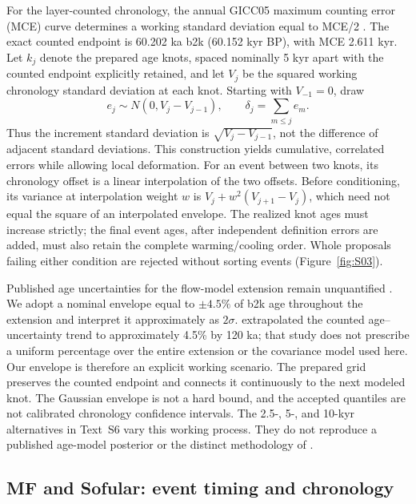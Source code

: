 \documentclass[11pt]{article}
\begin{document}
For the layer-counted chronology, the annual GICC05 maximum counting error (MCE) curve determines a working standard deviation equal to MCE/2 \citep{svensson2008sixty,rasmussen2022gicc05}. The exact counted endpoint is 60.202 ka b2k (60.152 kyr BP), with MCE 2.611 kyr. Let $k_j$ denote the prepared age knots, spaced nominally 5 kyr apart with the counted endpoint explicitly retained, and let $V_j$ be the squared working chronology standard deviation at each knot. Starting with $V_{-1}=0$, draw
\begin{equation}
 e_j\sim N(0,V_j-V_{j-1}),\qquad \delta_j=\sum_{m\leq j}e_m.
\end{equation}
Thus the increment standard deviation is $\sqrt{V_j-V_{j-1}}$, not the difference of adjacent standard deviations. This construction yields cumulative, correlated errors while allowing local deformation. For an event between two knots, its chronology offset is a linear interpolation of the two offsets. Before conditioning, its variance at interpolation weight $w$ is $V_j+w^2(V_{j+1}-V_j)$, which need not equal the square of an interpolated envelope. The realized knot ages must increase strictly; the final event ages, after independent definition errors are added, must also retain the complete warming/cooling order. Whole proposals failing either condition are rejected without sorting events (Figure~\ref{fig:S03}).

Published age uncertainties for the flow-model extension remain unquantified \citep{corrick2020synchronous}. We adopt a nominal envelope equal to $\pm4.5\%$ of b2k age throughout the extension and interpret it approximately as $2\sigma$. \citet{moseley2020nalps19} extrapolated the counted age--uncertainty trend to approximately 4.5\% by 120 ka; that study does not prescribe a uniform percentage over the entire extension or the covariance model used here. Our envelope is therefore an explicit working scenario. The prepared grid preserves the counted endpoint and connects it continuously to the next modeled knot. The Gaussian envelope is not a hard bound, and the accepted quantiles are not calibrated chronology confidence intervals. The 2.5-, 5-, and 10-kyr alternatives in Text~S6 vary this working process. They do not reproduce a published age-model posterior or the distinct methodology of \citet{myrvollnilsen2022comprehensive}.

\subsection*{MF and Sofular: event timing and chronology}
\end{document}
